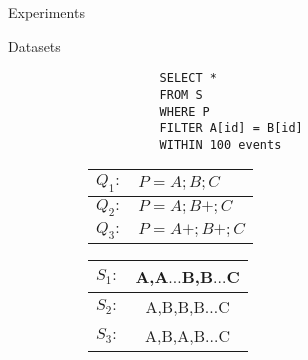\documentclass[xcolor=pdftex,dvipsnames,table]{beamer}
\begin{document}
\begin{frame}[fragile]{Experiments}
  \begin{block}{Datasets}
    \begin{figure}[H]
      \centering
      \begin{subfigure}[c]{0.32\textwidth}
        \centering
        \begin{verbatim}
          SELECT *
          FROM S
          WHERE P
          FILTER A[id] = B[id]
          WITHIN 100 events
        \end{verbatim}
      \end{subfigure}
      \begin{subfigure}[t]{0.32\textwidth}
        \begin{tabular}{l l}
          \hline
          $Q_{1}:$ & $P = A;B;C$ \\
          \hline
          $Q_{2}:$ & $P = A;B+;C$ \\
          \hline
          $Q_{3}:$ & $P = A+;B+;C$ \\
          \hline
        \end{tabular}
      \end{subfigure}
      \hfill
      \begin{subfigure}[c]{0.32\textwidth}
        \centering
        \begin{tabular}{l c}
          \hline
          $S_{1}:$ & A,A$\ldots$B,B$\ldots$C\\
          \hline
          $S_{2}:$ & A,B,B,B$\ldots$C\\
          \hline
          $S_{3}:$ & A,B,A,B$\ldots$C\\
          \hline
        \end{tabular}
      \end{subfigure}
    \end{figure}
  \end{block}
\end{frame}

\end{document}
